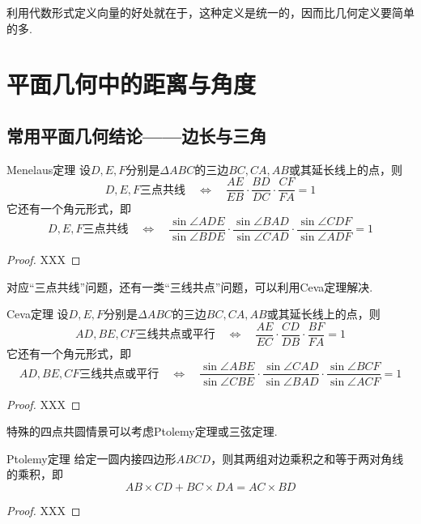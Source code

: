 \documentclass[lang=cn, zihao=5]{elegantbook}
\begin{document}
利用代数形式定义向量的好处就在于，这种定义是统一的，因而比几何定义要简单的多.



\chapter{平面几何中的距离与角度}

\section{常用平面几何结论——边长与三角}

\begin{theorem}{Menelaus定理}
    设$D,E,F$分别是$\Delta ABC$的三边$BC,CA,AB$或其延长线上的点，则$$D,E,F \text{三点共线} \quad \Longleftrightarrow \quad \frac{AE}{EB} \cdot \frac{BD}{DC} \cdot \frac{CF}{FA} = 1$$
    它还有一个角元形式，即$$D,E,F \text{三点共线} \quad \Longleftrightarrow \quad \frac{\sin \angle ADE}{\sin \angle BDE} \cdot \frac{\sin \angle BAD}{\sin \angle CAD} \cdot \frac{\sin \angle CDF}{\sin \angle ADF} = 1$$
\end{theorem}
\begin{proof}
    XXX
\end{proof}

对应“三点共线”问题，还有一类“三线共点”问题，可以利用Ceva定理解决.

\begin{theorem}{Ceva定理}
    设$D,E,F$分别是$\Delta ABC$的三边$BC,CA,AB$或其延长线上的点，则$$AD,BE,CF \text{三线共点或平行} \quad \Longleftrightarrow \quad \frac{AE}{EC} \cdot \frac{CD}{DB} \cdot \frac{BF}{FA} = 1$$
    它还有一个角元形式，即$$AD,BE,CF \text{三线共点或平行} \quad \Longleftrightarrow \quad \frac{\sin \angle ABE}{\sin \angle CBE} \cdot \frac{\sin \angle CAD}{\sin \angle BAD} \cdot \frac{\sin \angle BCF}{\sin \angle ACF} = 1$$
\end{theorem}
\begin{proof}
    XXX
\end{proof}

特殊的四点共圆情景可以考虑Ptolemy定理或三弦定理.

\begin{theorem}{Ptolemy定理}
    给定一圆内接四边形$ABCD$，则其两组对边乘积之和等于两对角线的乘积，即$$AB \times CD + BC \times DA = AC \times BD$$
\end{theorem}
\begin{proof}
    XXX
\end{proof}
\end{document}
